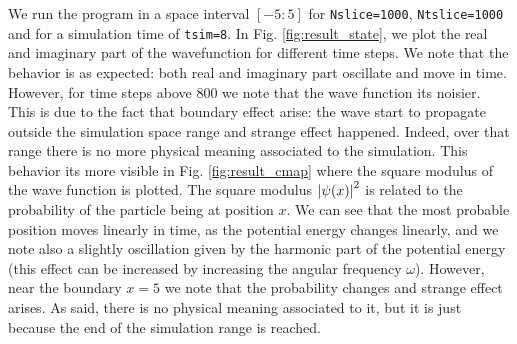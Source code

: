 \documentclass[rmp,10pt,onecolumn,fleqn,notitlepage]{revtex4-1}
\begin{document}
We run the program in a space interval \( [-5:5] \) for \texttt{Nslice=1000}, \texttt{Ntslice=1000} and for a simulation time of \texttt{tsim=8}. In Fig. \ref{fig:result_state}, we plot the real and imaginary part of the wavefunction for different time steps.
We note that the behavior is as expected: both real and imaginary part oscillate and move in time. However, for time steps above 800 we note that the wave function its noisier. This is due to the fact that boundary effect arise: the wave start to propagate outside the simulation space range and strange effect happened. Indeed, over that range there is no more physical meaning associated to the simulation.
This behavior its more visible in Fig. \ref{fig:result_cmap} where the square modulus of the wave function is plotted.
The square modulus \( \abs{\psi (x)}^2  \) is related to the probability of the particle being at position \( x \). We can see that the most probable position moves linearly in time, as the potential energy changes linearly, and we note also a slightly oscillation given by the harmonic part of the potential energy (this effect can be increased by increasing the angular frequency \( \omega  \)). However, near the boundary \( x=5 \) we note that the probability changes and strange effect arises. As said, there is no physical meaning associated to it, but it is just because the end of the simulation range is reached.
\end{document}
